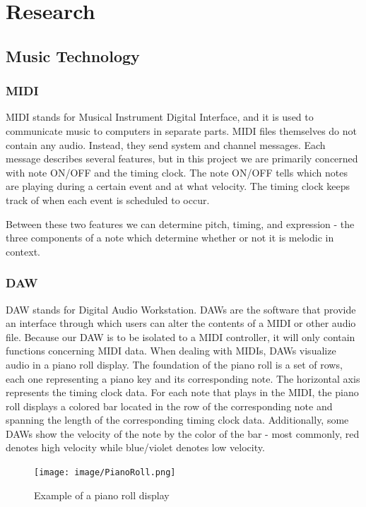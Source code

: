 \section{Research}

\subsection{Music Technology}

\subsubsection{MIDI}

MIDI stands for Musical Instrument Digital Interface, and it is used to communicate music
to computers in separate parts. MIDI files themselves do not contain any audio. Instead, they
send system and channel messages. Each message describes several features, but in this project
we are primarily concerned with note ON/OFF and the timing clock. The note ON/OFF tells which
notes are playing during a certain event and at what velocity. The timing clock keeps track of
when each event is scheduled to occur.

Between these two features we can determine pitch, timing, and expression - the three
components of a note which determine whether or not it is melodic in context.

\subsubsection{DAW}
\label{sec:daw}

DAW stands for Digital Audio Workstation. DAWs are the software that provide an interface
through which users can alter the contents of a MIDI or other audio file. Because our DAW is
to be isolated to a MIDI controller, it  will only contain functions concerning MIDI data.
When dealing with MIDIs, DAWs visualize audio in a piano roll display. The foundation of the
piano roll is a set of rows, each one representing a piano key and its corresponding note.
The horizontal axis represents the timing clock data. For each note that plays in the MIDI, the
piano roll displays a colored bar located in the row of the corresponding note and spanning the
length of the corresponding timing clock data. Additionally, some DAWs show the velocity of the
note by the color of the bar - most commonly, red denotes high velocity while blue/violet
denotes low velocity.

\begin{figure}[h!]
  \centering
  \texttt{[image: image/PianoRoll.png]}
  \caption{Example of a piano roll display}
  \label{fig:piano_roll}
\end{figure}

